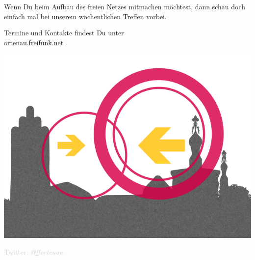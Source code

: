 \documentclass[a4paper]{article}
\begin{document}
\vspace{1.3cm}
\begin{Row}
    \begin{Cell}{1}
	Wenn Du beim Aufbau des freien Netzes mitmachen möchtest, dann schau doch einfach mal bei unserem wöchentlichen Treffen vorbei.
	\end{Cell}
\end{Row}
\vspace{0.5cm}
\begin{center}
	\large Termine und Kontakte findest Du unter \\
	\url{ortenau.freifunk.net}
\end{center}
\begin{center}
\vspace{-0.5cm}
\hspace*{-0.05 \paperwidth}\includegraphics[width=\paperwidth]{../../images/logo_skyline_large}

\vspace{-2.7cm}
\large \textcolor{lightgrey}{Twitter: \textit{@ffortenau}}
\end{center}
\end{document}

